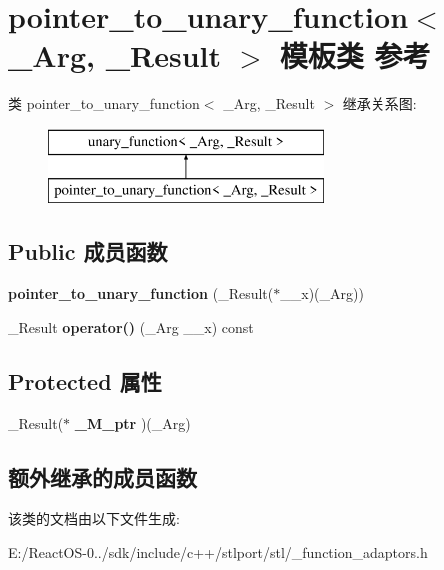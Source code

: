 \hypertarget{classpointer__to__unary__function}{}\section{pointer\+\_\+to\+\_\+unary\+\_\+function$<$ \+\_\+\+Arg, \+\_\+\+Result $>$ 模板类 参考}
\label{classpointer__to__unary__function}
类 pointer\+\_\+to\+\_\+unary\+\_\+function$<$ \+\_\+\+Arg, \+\_\+\+Result $>$ 继承关系图\+:\begin{figure}[H]
\begin{center}
\leavevmode
\includegraphics[height=2.000000cm]{classpointer__to__unary__function}
\end{center}
\end{figure}
\subsection*{Public 成员函数}
\begin{DoxyCompactItemize}
\item 
\mbox{\label{classpointer__to__unary__function_af666fa525a46ba9fb7ffec0649694421}} 
{\bfseries pointer\+\_\+to\+\_\+unary\+\_\+function} (\+\_\+\+Result($\ast$\+\_\+\+\_\+x)(\+\_\+\+Arg))
\item 
\mbox{\label{classpointer__to__unary__function_a1b02ef9e299073db443517b864cec642}} 
\+\_\+\+Result {\bfseries operator()} (\+\_\+\+Arg \+\_\+\+\_\+x) const
\end{DoxyCompactItemize}
\subsection*{Protected 属性}
\begin{DoxyCompactItemize}
\item 
\mbox{\label{classpointer__to__unary__function_a0e807dafa33df92f86f47cdf80562faf}} 
\+\_\+\+Result($\ast$ {\bfseries \+\_\+\+M\+\_\+ptr} )(\+\_\+\+Arg)
\end{DoxyCompactItemize}
\subsection*{额外继承的成员函数}


该类的文档由以下文件生成\+:\begin{DoxyCompactItemize}
\item 
E\+:/\+React\+O\+S-\/0../sdk/include/c++/stlport/stl/\+\_\+function\+\_\+adaptors.\+h\end{DoxyCompactItemize}
